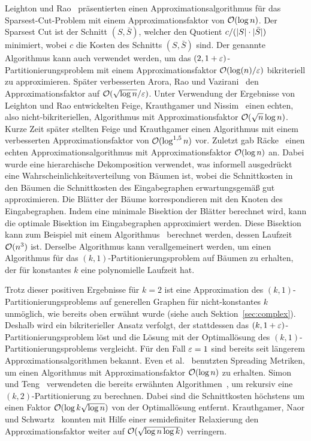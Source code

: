 Leighton und Rao~\cite{LR99} präsentierten einen Approximationsalgorithmus für das Sparsest-Cut-Problem mit einem Approximationsfaktor von $\mathcal{O}(\log n)$.
Der Sparsest Cut ist der Schnitt $(S, \bar{S})$, welcher den Quotient $c/(\lvert S\rvert \cdot  \lvert\bar{S}\rvert)$ minimiert, wobei $c$ die Kosten des Schnitts $(S, \bar{S})$ sind.
Der genannte Algorithmus kann auch verwendet werden, um das $(2, 1 + \varepsilon)$\hyp Partitionierungsproblem mit einem Approximationsfaktor $\mathcal{O}(\log(n)/\varepsilon)$ bikriteriell zu approximieren.
Später verbesserten Arora, Rao und Vazirani~\cite{ARV09} den Approximationsfaktor auf $\mathcal{O}(\sqrt{\log n}/\varepsilon)$.
Unter Verwendung der Ergebnisse von Leighton und Rao entwickelten Feige, Krauthgamer und Nissim~\cite{FKN00} einen echten, also nicht-bikriteriellen, Algorithmus mit Approximationsfaktor $\mathcal{O}(\sqrt{n} \log n)$.
Kurze Zeit später stellten Feige und Krauthgamer einen Algorithmus mit einem verbesserten Approximationsfaktor von $\mathcal{O}(\log^{1,5} n)$ vor.
Zuletzt gab Räcke~\cite{rc08} einen echten Approximationsalgorithmus mit Approximationsfaktor $\mathcal{O}(\log n)$ an.
Dabei wurde eine hierarchische Dekomposition verwendet, was informell ausgedrückt eine Wahrscheinlichkeitsverteilung von Bäumen ist, wobei die Schnittkosten in den Bäumen die Schnittkosten des Eingabegraphen erwartungsgemäß gut approximieren.
Die Blätter der Bäume korrespondieren mit den Knoten des Eingabegraphen.
Indem eine minimale Bisektion der Blätter berechnet wird, kann die optimale Bisektion im Eingabegraphen approximiert werden.
Diese Bisektion kann zum Beispiel mit einem Algorithmus~\cite{mcg78, ws11} berechnet werden, dessen Laufzeit $\mathcal{O}(n^3)$ ist.
Derselbe Algorithmus kann verallgemeinert werden, um einen Algorithmus für das $(k, 1)$\hyp Partitionierungsproblem auf Bäumen zu erhalten, der für konstantes $k$ eine polynomielle Laufzeit hat.

Trotz dieser positiven Ergebnisse für $k=2$ ist eine Approximation des $(k, 1)$\hyp Partitionierungsproblems auf generellen Graphen für nicht-konstantes $k$ unmöglich, wie bereits oben erwähnt wurde (siehe auch Sektion~\ref{sec:complex}).
Deshalb wird ein bikriterieller Ansatz verfolgt, der stattdessen das $(k,1+\varepsilon)$\hyp Partitionierungsproblem löst und die Lösung mit der Optimallösung des $(k, 1)$\hyp Partitionierungsproblems vergleicht.
Für den Fall $\varepsilon = 1$ sind bereits seit längerem Approximationsalgorithmen bekannt.
Even et al.~\cite{ENR+97} benutzten Spreading Metriken, um einen Algorithmus mit Approximationsfaktor $\mathcal{O}(\log n)$ zu erhalten.
Simon und Teng~\cite{ST97} verwendeten die bereits erwähnten Algorithmen~\cite{LR99, ARV09}, um rekursiv eine $(k, 2)$\hyp Partitionierung zu berechnen.
Dabei sind die Schnittkosten höchstens um einen Faktor $\mathcal{O}(\log k \sqrt{\log n})$ von der Optimallösung entfernt.
Krauthgamer, Naor und Schwartz~\cite{KNS09} konnten mit Hilfe einer semidefiniter Relaxierung den Approximationsfaktor weiter auf $\mathcal{O}(\sqrt{\log n \log k})$ verringern.

